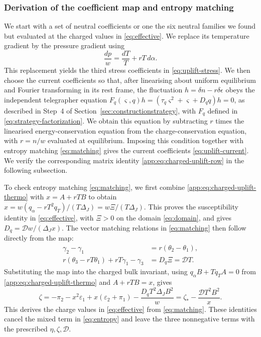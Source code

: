 \subsubsection*{Derivation of the coefficient map and entropy matching}
\label{app:sec:charged-map-entropy}
We start with a set of neutral coefficients or one the six neutral families we found but  evaluated at the
charged values in  \eqref{eq:effective}. We replace its temperature
gradient by the pressure gradient using
\begin{equation}
 \frac{dp}{w}=\frac{dT}{T}+rT\,d\alpha.
\end{equation}
This replacement yields the third stress coefficients in
\eqref{eq:uplift-stress}. We then choose the current coefficients so that,
after linearising about uniform equilibrium and Fourier transforming in its
rest frame, the fluctuation $h=\delta n-r\delta\epsilon$ obeys the independent
telegrapher equation
$F_q(\varsigma,q)h=(\tau_q\varsigma^2+\varsigma+D_qq)h=0$, as described
in Step~4 of Section~\ref{sec:constructionstrategy}, with $F_q$ defined in
\eqref{eq:strategy-factorization}. We obtain this equation by subtracting
$r$ times the linearised energy-conservation equation from the
charge-conservation equation, with $r=n/w$ evaluated at equilibrium.
Imposing this condition together with entropy matching \eqref{eq:matching}
gives the current coefficients \eqref{eq:uplift-current}. We verify the
corresponding matrix identity \eqref{app:eq:charged-uplift-row} in the
following subsection.

To check entropy matching \eqref{eq:matching}, we first combine
\eqref{app:eq:charged-uplift-thermo} with $x=A+rTB$ to obtain
$x=w(q_\alpha-rT^2q_T)/(T\Delta_J)=w\Xi/(T\Delta_J)$.
This proves the susceptibility identity in \eqref{eq:effective}, with
$\Xi>0$ on the domain \eqref{eq:domain}, and gives
$D_q=\mathcal D w/(\Delta_Jx)$.
The vector matching relations in \eqref{eq:matching} then follow
directly from the map:
\begin{align}
 \gamma_2-\gamma_1&=r(\theta_2-\theta_1),\\
 r(\theta_3-rT\theta_1)+rT\gamma_1-\gamma_3
     &=D_q\Xi=\mathcal D T.
\end{align}
Substituting the map into the charged bulk invariant, using
$q_\alpha B+Tq_TA=0$ from \eqref{app:eq:charged-uplift-thermo} and
$A+rTB=x$, gives
\begin{equation}\label{app:eq:charged-uplift-bulk}
 \zeta=-\pi_2-x^2\varepsilon_1+x(\varepsilon_2+\pi_1)
       -\frac{D_qT^2\Delta_JB^2}{w}
 =\zeta_*-\frac{\mathcal D T^2B^2}{x}.
\end{equation}
This derives the charge values  in \eqref{eq:effective} from
\eqref{eq:matching}.  These identities cancel the mixed term in \eqref{eq:entropy} and leave
the three nonnegative terms with the prescribed $\eta,\zeta,\mathcal D$.



